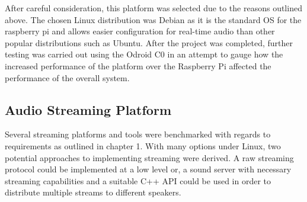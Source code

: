 \documentclass[main.tex]{subfiles}
\begin{document}
\medskip
After careful consideration, this platform was selected due to the reasons outlined above. 
The chosen Linux distribution was Debian as it is the standard OS for the raspberry pi and allows easier configuration for real-time audio than other popular distributions such as Ubuntu. 
After the project was completed, further testing was carried out using the Odroid C0 in an attempt to gauge how the increased performance of the platform over the Raspberry Pi affected the performance of the overall system. 

\subsection{Audio Streaming Platform}
Several streaming platforms and tools were benchmarked with regards to requirements as outlined in chapter 1. 
With many options under Linux, two potential approaches to implementing streaming were derived. 
A raw streaming protocol could be implemented at a low level or, a sound server with necessary streaming capabilities and a suitable C++ API could be used in order to distribute multiple streams to different speakers.

\medskip

\medskip
\end{document}
